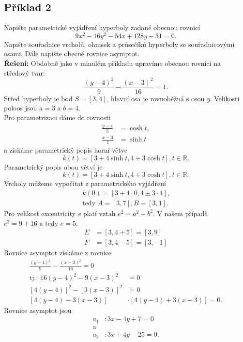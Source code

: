 			\subsection*{Příklad 2}
			Napište parametrické vyjádření hyperboly zadané obecnou rovnicí
			$$9x^2-16y^2-54x+128y-31=0.$$
			Napište souřadnice vrcholů, ohnisek a průsečíků hyperboly se souřadnicovými osami. Dále napište obecné rovnice asymptot.\\[5pt]
			\textbf{Řešení:} Obdobně jako v minulém příkladu upravíme obecnou rovnici na středový tvar:
			$$\frac{(y-4)^2}{9}-\frac{(x-3)^2}{16}=1.$$
			Střed hyperboly je bod $S=[3,4]$, hlavní osa je rovnoběžná s osou \textit{y}. Velikosti poloos jsou $a=3$ a $b=4$. \\
			Pro parametrizaci dáme do rovnosti \\
			\begin{align*}
				\frac{y-4}{3} & =\cosh{t}, \\ \frac{x-3}{4}&=\sinh{t}
			\end{align*}
			a získáme parametrický popis horní větve
			$$k(t)=[3+4\sinh{t}, 4+3\cosh{t}], t \in \mathbb{R}\text{.}$$
			Parametrický popis obou větví je
			$$k(t)=[3+4\sinh{t}, 4\pm3\cosh{t}], t \in \mathbb{R}\text{.}$$
			Vrcholy můžeme vypočítat z parametrického vyjádření
			\begin{align*}
				k(0)=[3+4\cdot0, 4\pm3\cdot1] \text{,} \\
				\text{tedy }                           
				A=[3, 7], B=[3, 1].                    
			\end{align*}
			Pro velikost excentricity \textit{e} platí vztah $e^2=a^2+b^2$. V našem případě \\ $e^2=9+16$
			a tedy $e=5$.
			\begin{align*}
				E & =[3, 4+5]=[3, 9] \\
				F & =[3, 4-5]=[3,-1] 
			\end{align*}
			Rovnice asymptot získáme z rovnice
			\begin{align*}
				\frac{(y-4)^2}{9}-\frac{(x-3)^2}{16}=0 \\
				\text{tj.: } 16(y-4)^2-9(x-3)^2 & =0                        \\
				[4(y-4)]^2-[3(x-3)]^2           & =0                        \\
				[4(y-4)-3(x-3)]                 & \cdot[4(y-4)+3(x-3)] = 0. 
			\end{align*}
			Rovnice asymptot jsou
			\begin{align*}
				a_1 & : 3x-4y+7  =0  \\
				\text{a}\\
				a_2 & : 3x+4y-25 =0. 
			\end{align*}
